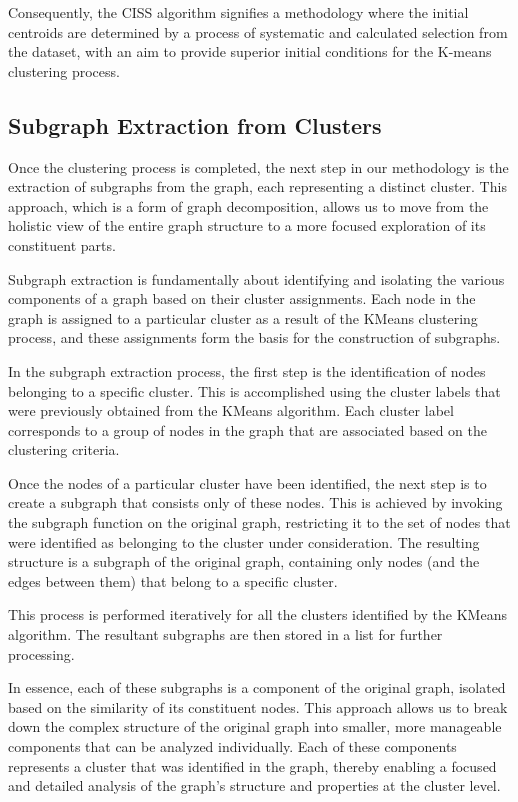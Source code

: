 \documentclass[10pt,twocolumn,a4paper]{article}
\begin{document}
Consequently, the CISS algorithm signifies a methodology where the initial centroids are determined by a process of systematic and calculated selection from the dataset, with an aim to provide superior initial conditions for the K-means clustering process.


\subsection{Subgraph Extraction from Clusters}

Once the clustering process is completed, the next step in our methodology is the extraction of subgraphs from the graph, each representing a distinct cluster. This approach, which is a form of graph decomposition, allows us to move from the holistic view of the entire graph structure to a more focused exploration of its constituent parts.

Subgraph extraction is fundamentally about identifying and isolating the various components of a graph based on their cluster assignments. Each node in the graph is assigned to a particular cluster as a result of the KMeans clustering process, and these assignments form the basis for the construction of subgraphs.

In the subgraph extraction process, the first step is the identification of nodes belonging to a specific cluster. This is accomplished using the cluster labels that were previously obtained from the KMeans algorithm. Each cluster label corresponds to a group of nodes in the graph that are associated based on the clustering criteria.

Once the nodes of a particular cluster have been identified, the next step is to create a subgraph that consists only of these nodes. This is achieved by invoking the subgraph function on the original graph, restricting it to the set of nodes that were identified as belonging to the cluster under consideration. The resulting structure is a subgraph of the original graph, containing only nodes (and the edges between them) that belong to a specific cluster.

This process is performed iteratively for all the clusters identified by the KMeans algorithm. The resultant subgraphs are then stored in a list for further processing.

In essence, each of these subgraphs is a component of the original graph, isolated based on the similarity of its constituent nodes. This approach allows us to break down the complex structure of the original graph into smaller, more manageable components that can be analyzed individually. Each of these components represents a cluster that was identified in the graph, thereby enabling a focused and detailed analysis of the graph's structure and properties at the cluster level.
\end{document}
